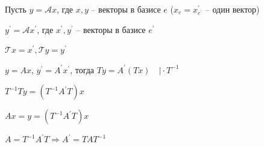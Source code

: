 \documentclass[12pt]{article}
\begin{document}
    \begin{MyProof}
        Пусть $y = \mathcal{A}x$, где $x, y$ -- векторы в базисе $e$ ($x_e = x^\prime_{e^\prime}$ -- один вектор)

        $y^\prime = \mathcal{A} x^\prime$, где $x^\prime, y^\prime$ -- векторы в базисе $e^\prime$

        $\mathcal{T}x = x^\prime, \mathcal{T}y = y^\prime$

        $y = Ax$, $y^\prime = A^\prime x^\prime$, тогда $Ty = A^\prime (Tx) \quad \Big| \cdot T^{-1}$

        $T^{-1}Ty = (T^{-1}A^\prime T)x$
        
        $Ax = y = (T^{-1}A^\prime T)x$

        $A = T^{-1}A^\prime T \Longrightarrow A^\prime = TA T^{-1}$
    \end{MyProof}
\end{document}
